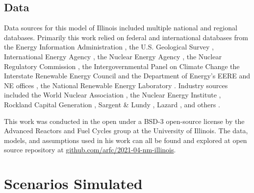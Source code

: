 \subsection{Data}
Data sources for this model of Illinois included multiple national and regional 
databases. Primarily this work relied on federal and international databases from the 
Energy Information Administration 
\cite{us_energy_information_administration_eia_preliminary_2021,energy_information_administration_state_2020,us_energy_information_administration_eia_electric_2021,us_energy_information_administration_eia_illinois_2020}, 
the U.S. Geological Survey \cite{hoen_united_2018}, 
International Energy Agency \cite{lorenczik_projected_2020}, 
the Nuclear Energy Agency \cite{crozat_full_2018}
, the Nuclear Regulatory Commission \cite{united_states_nuclear_regulatory_commission_illinois_2020}, 
the Intergovernmental Panel on Climate Change 
\cite{intergovernmental_panel_on_climate_change_annex_2014,intergovernmental_panel_on_climate_change_climate_2014,intergovernmental_panel_on_climate_change_climate_2014-1,intergovernmental_panel_on_climate_change_climate_2014-2}
the Interstate Renewable Energy Council 
\cite{sherwood_us_2009,sherwood_us_2010,sherwood_us_2011,brown_solid_1996,sherwood_us_2012,sherwood_us_2013,sherwood_us_2014}
and the Department of Energy's EERE and NE offices 
\cite{us_department_of_energy_capital_2016}, the National Renewable Energy 
Laboratory \cite{nrel_national_renewable_energy_laboratory_2020_2020}.
Industry sources included the World Nuclear Association
\cite{world_nuclear_association_nuclear_2017}
, 
the Nuclear Energy Institute 
\cite{desai_nuclear_2018,desai_nuclear_2020,murphy_impacts_2019,tessum_air_2019},
Rockland Capital Generation \cite{rockland_capital_natural_2021},
Sargent \& Lundy \cite{sargent__lundy_capital_2020}, 
Lazard \cite{ray_lazards_2020},
and others 
\cite{the_solar_foundation_national_2020,solar_energy_industries_association_illinois_2020,rutovitz_calculating_2015}.


This work was conducted in the open under a BSD-3 open-source license by the 
Advanced Reactors and Fuel Cycles group at the University of Illinois. The 
data, models, and assumptions used in his work can all be found and explored at 
open source repository at 
\href{https://github.com/arfc/2021-04-nm-illinois}{github.com/arfc/2021-04-nm-illinois}.


\section{Scenarios Simulated}\label{sec:simulations}

